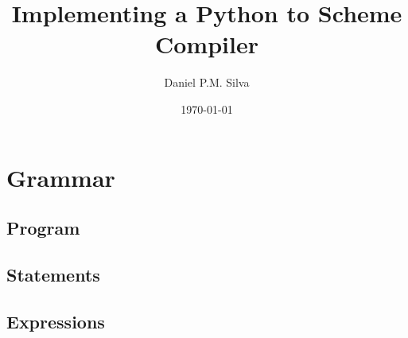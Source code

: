 \documentclass[12pt]{article}
\title{Implementing a Python to Scheme Compiler}
\author{Daniel P.M. Silva}
\date{\today}
\begin{document}
	\maketitle
	
	

	

	\let\rulesection\subsubsection
	\section{Grammar}
		\label{grammar}
		
		\subsection{Program}
			
		\subsection{Statements}
			
		\subsection{Expressions}
			

\end{document}
